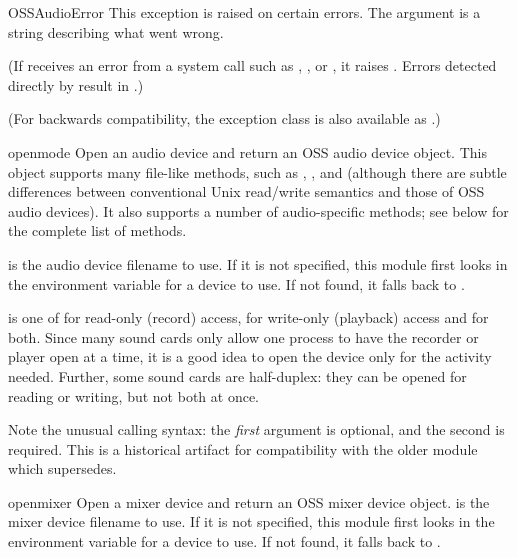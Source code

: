 \begin{excdesc}{OSSAudioError}
This exception is raised on certain errors.  The argument is a string
describing what went wrong.

(If  receives an error from a system call such as
, , or , it
raises .  Errors detected directly by
 result in .)

(For backwards compatibility, the exception class is also available as
.)
\end{excdesc}

\begin{funcdesc}{open}{mode}
Open an audio device and return an OSS audio device object.  This
object supports many file-like methods, such as ,
, and  (although there are subtle
differences between conventional Unix read/write semantics and those of
OSS audio devices).  It also supports a number of audio-specific
methods; see below for the complete list of methods.

 is the audio device filename to use.  If it is not
specified, this module first looks in the environment variable
 for a device to use.  If not found, it falls back to
.

 is one of  for read-only (record) access,
 for write-only (playback) access and  for both.
Since many sound cards only allow one process to have the recorder or
player open at a time, it is a good idea to open the device only for the
activity needed.  Further, some sound cards are half-duplex: they can be
opened for reading or writing, but not both at once.

Note the unusual calling syntax: the \emph{first} argument is optional,
and the second is required.  This is a historical artifact for
compatibility with the older  module which
 supersedes.  %
\end{funcdesc}

\begin{funcdesc}{openmixer}{}
Open a mixer device and return an OSS mixer device object.  
 is the mixer device filename to use.  If it is
not specified, this module first looks in the environment variable
 for a device to use.  If not found, it falls back to
.

\end{funcdesc}

